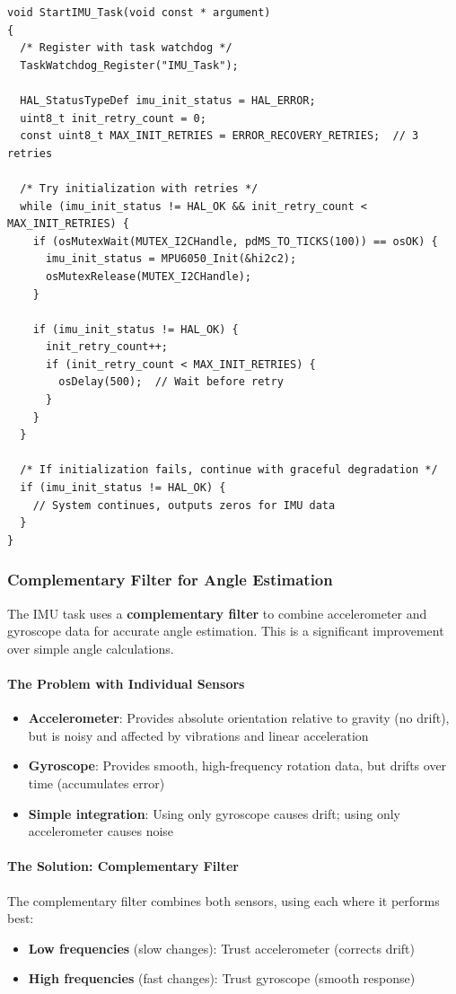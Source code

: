 \documentclass[11pt,a4paper]{article}
\begin{document}
\begin{lstlisting}[caption=IMU Task Initialization with Retries, label=lst:imutask]
void StartIMU_Task(void const * argument)
{
  /* Register with task watchdog */
  TaskWatchdog_Register("IMU_Task");
  
  HAL_StatusTypeDef imu_init_status = HAL_ERROR;
  uint8_t init_retry_count = 0;
  const uint8_t MAX_INIT_RETRIES = ERROR_RECOVERY_RETRIES;  // 3 retries
  
  /* Try initialization with retries */
  while (imu_init_status != HAL_OK && init_retry_count < MAX_INIT_RETRIES) {
    if (osMutexWait(MUTEX_I2CHandle, pdMS_TO_TICKS(100)) == osOK) {
      imu_init_status = MPU6050_Init(&hi2c2);
      osMutexRelease(MUTEX_I2CHandle);
    }
    
    if (imu_init_status != HAL_OK) {
      init_retry_count++;
      if (init_retry_count < MAX_INIT_RETRIES) {
        osDelay(500);  // Wait before retry
      }
    }
  }
  
  /* If initialization fails, continue with graceful degradation */
  if (imu_init_status != HAL_OK) {
    // System continues, outputs zeros for IMU data
  }
}
\end{lstlisting}

\subsubsection{Complementary Filter for Angle Estimation}
The IMU task uses a \textbf{complementary filter} to combine accelerometer and gyroscope data for accurate angle estimation. This is a significant improvement over simple angle calculations.

\paragraph{The Problem with Individual Sensors}
\begin{itemize}
    \item \textbf{Accelerometer}: Provides absolute orientation relative to gravity (no drift), but is noisy and affected by vibrations and linear acceleration
    \item \textbf{Gyroscope}: Provides smooth, high-frequency rotation data, but drifts over time (accumulates error)
    \item \textbf{Simple integration}: Using only gyroscope causes drift; using only accelerometer causes noise
\end{itemize}

\paragraph{The Solution: Complementary Filter}
The complementary filter combines both sensors, using each where it performs best:
\begin{itemize}
    \item \textbf{Low frequencies} (slow changes): Trust accelerometer (corrects drift)
    \item \textbf{High frequencies} (fast changes): Trust gyroscope (smooth response)
\end{itemize}
\end{document}
